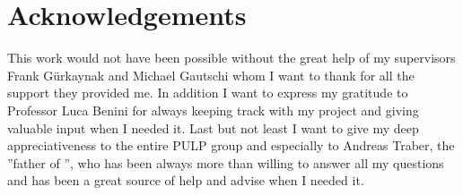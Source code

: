 
\chapter*{Acknowledgements}


This work would not have been possible without the great help of my supervisors Frank G\"urkaynak and Michael Gautschi whom I want to thank for all the support they provided me. In addition I want to express my gratitude to Professor Luca Benini for always keeping track with my project and giving valuable input when I needed it. Last but not least I want to give my deep appreciativeness to the entire PULP group and especially to Andreas Traber, the ''father of \pulpino'', who has been always more than willing to answer all my questions and has been a great source of help and advise when I needed it.  